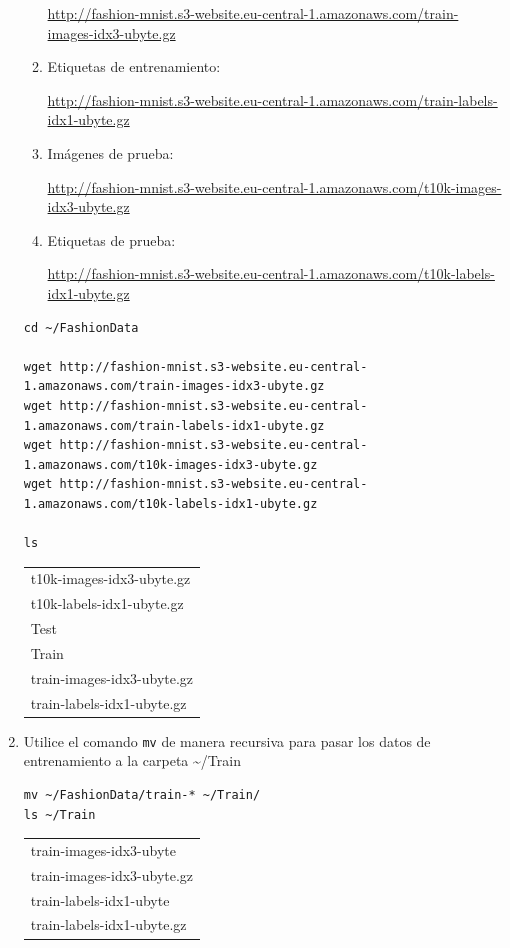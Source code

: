 \documentclass{article}
\begin{document}
\begin{enumerate}
\begin{enumerate}
\url{http://fashion-mnist.s3-website.eu-central-1.amazonaws.com/train-images-idx3-ubyte.gz}
\item Etiquetas de entrenamiento:

\url{http://fashion-mnist.s3-website.eu-central-1.amazonaws.com/train-labels-idx1-ubyte.gz}
\item Imágenes de prueba:

\url{http://fashion-mnist.s3-website.eu-central-1.amazonaws.com/t10k-images-idx3-ubyte.gz}
\item Etiquetas de prueba:

\url{http://fashion-mnist.s3-website.eu-central-1.amazonaws.com/t10k-labels-idx1-ubyte.gz}
\end{enumerate}
\begin{verbatim}
cd ~/FashionData

wget http://fashion-mnist.s3-website.eu-central-1.amazonaws.com/train-images-idx3-ubyte.gz
wget http://fashion-mnist.s3-website.eu-central-1.amazonaws.com/train-labels-idx1-ubyte.gz
wget http://fashion-mnist.s3-website.eu-central-1.amazonaws.com/t10k-images-idx3-ubyte.gz
wget http://fashion-mnist.s3-website.eu-central-1.amazonaws.com/t10k-labels-idx1-ubyte.gz

ls
\end{verbatim}

\begin{table}[htbp]
\label{tab:org6fc8b51}
\centering
\begin{tabular}{l}
t10k-images-idx3-ubyte.gz\\
t10k-labels-idx1-ubyte.gz\\
Test\\
Train\\
train-images-idx3-ubyte.gz\\
train-labels-idx1-ubyte.gz\\
\end{tabular}
\end{table}

\item Utilice el comando \texttt{mv} de manera recursiva para pasar los datos de
entrenamiento a la carpeta \textasciitilde{}/Train
\begin{verbatim}
mv ~/FashionData/train-* ~/Train/
ls ~/Train
\end{verbatim}

\begin{table}[htbp]
\label{tab:org123e012}
\centering
\begin{tabular}{l}
train-images-idx3-ubyte\\
train-images-idx3-ubyte.gz\\
train-labels-idx1-ubyte\\
train-labels-idx1-ubyte.gz\\
\end{tabular}
\end{table}


\end{enumerate}
\end{document}
